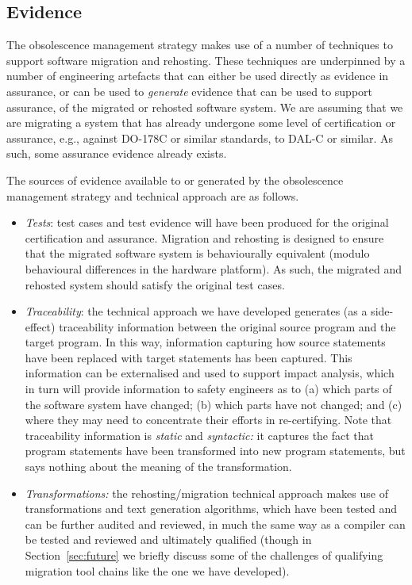 \documentclass{llncs}
\begin{document}
\subsection{Evidence}
The obsolescence management strategy makes use of a number of techniques to support software migration and rehosting.
These techniques are underpinned by a number of engineering artefacts that can either be used directly as evidence in assurance, or
can be used to \textit{generate} evidence that can be used to support assurance, of the migrated or rehosted software system. 
We are assuming that we are migrating a system that has already undergone some level of certification or assurance,
e.g., against DO-178C or similar standards, to DAL-C or similar. As such, some assurance evidence already exists.

The sources of evidence available to or generated by the obsolescence management strategy and technical approach are as follows.

\begin{itemize}
\item \textit{Tests}: test cases and test evidence will have been produced for the original certification and assurance. Migration and rehosting
is designed to ensure that the migrated software system is behaviourally equivalent (modulo behavioural differences in the hardware platform).
As such, the migrated and rehosted system should satisfy the original test cases.

\item \textit{Traceability}: the technical approach we have developed generates (as a side-effect) traceability information between the original
source program and the target program. In this way, information capturing how source statements have been replaced with target statements has
been captured. This information can be externalised and used to support impact analysis, which in turn will provide information to safety engineers as
to (a) which parts of the software system have changed; (b) which parts have not changed; and (c) where they may need to concentrate their efforts
in re-certifying. Note that traceability information is \textit{static} and \textit{syntactic:} it captures the fact that program statements have been 
transformed into new program statements, but says nothing about the meaning of the transformation.

\item \textit{Transformations:} the rehosting/migration technical approach makes use of transformations and text generation algorithms, which have
been tested and can be further audited and reviewed, in much the same way as a compiler can be tested and reviewed and ultimately qualified (though in Section~\ref{sec:future}
we briefly discuss some of the challenges of qualifying migration tool chains like the one we have developed).
\end{itemize}
\end{document}
